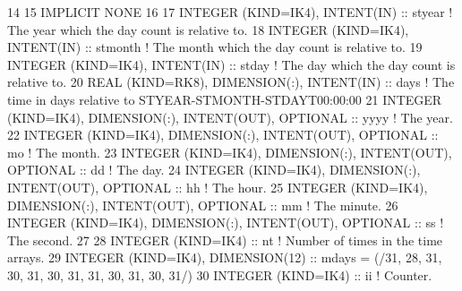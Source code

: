 \begin{DoxyCode}
14 
15 \textcolor{keywordtype}{IMPLICIT NONE}
16 
17 \textcolor{keywordtype}{INTEGER (KIND=IK4)}, \textcolor{keywordtype}{INTENT(IN)}                          :: styear       \textcolor{comment}{! The year which the day count is
       relative to.}
18 \textcolor{keywordtype}{INTEGER (KIND=IK4)}, \textcolor{keywordtype}{INTENT(IN)}                          :: stmonth      \textcolor{comment}{! The month which the day count is
       relative to.}
19 \textcolor{keywordtype}{INTEGER (KIND=IK4)}, \textcolor{keywordtype}{INTENT(IN)}                          :: stday        \textcolor{comment}{! The day which the day count is
       relative to.}
20 \textcolor{keywordtype}{REAL (KIND=RK8)}, \textcolor{keywordtype}{DIMENSION(:)}, \textcolor{keywordtype}{INTENT(IN)}               :: days         \textcolor{comment}{! The time in days relative to
       STYEAR-STMONTH-STDAYT00:00:00}
21 \textcolor{keywordtype}{INTEGER (KIND=IK4)}, \textcolor{keywordtype}{DIMENSION(:)}, \textcolor{keywordtype}{INTENT(OUT)}, \textcolor{keywordtype}{OPTIONAL} :: yyyy         \textcolor{comment}{! The year.}
22 \textcolor{keywordtype}{INTEGER (KIND=IK4)}, \textcolor{keywordtype}{DIMENSION(:)}, \textcolor{keywordtype}{INTENT(OUT)}, \textcolor{keywordtype}{OPTIONAL} :: mo           \textcolor{comment}{! The month.}
23 \textcolor{keywordtype}{INTEGER (KIND=IK4)}, \textcolor{keywordtype}{DIMENSION(:)}, \textcolor{keywordtype}{INTENT(OUT)}, \textcolor{keywordtype}{OPTIONAL} :: dd           \textcolor{comment}{! The day.}
24 \textcolor{keywordtype}{INTEGER (KIND=IK4)}, \textcolor{keywordtype}{DIMENSION(:)}, \textcolor{keywordtype}{INTENT(OUT)}, \textcolor{keywordtype}{OPTIONAL} :: hh           \textcolor{comment}{! The hour.}
25 \textcolor{keywordtype}{INTEGER (KIND=IK4)}, \textcolor{keywordtype}{DIMENSION(:)}, \textcolor{keywordtype}{INTENT(OUT)}, \textcolor{keywordtype}{OPTIONAL} :: mm           \textcolor{comment}{! The minute.}
26 \textcolor{keywordtype}{INTEGER (KIND=IK4)}, \textcolor{keywordtype}{DIMENSION(:)}, \textcolor{keywordtype}{INTENT(OUT)}, \textcolor{keywordtype}{OPTIONAL} :: ss           \textcolor{comment}{! The second.}
27 
28 \textcolor{keywordtype}{INTEGER (KIND=IK4)}                                      :: nt           \textcolor{comment}{! Number of times in the time
       arrays.}
29 \textcolor{keywordtype}{INTEGER (KIND=IK4)}, \textcolor{keywordtype}{DIMENSION(12)}                       :: mdays    = (/31, 28, 31, 30, 31, 30, 31, 31, 30,
       31, 30, 31/)
30 \textcolor{keywordtype}{INTEGER (KIND=IK4)}                                      :: ii           \textcolor{comment}{! Counter.}

\end{DoxyCode}
